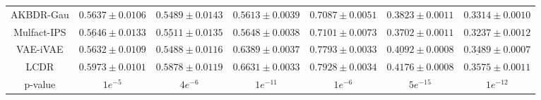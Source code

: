 \documentclass[sigconf]{acmart}
\begin{document}
\begin{table}[!t]
{\begin{tabular}{c|cc|cc|cc}
AKBDR-Gau & $0.5637 \pm 0.0106$ & $0.5489 \pm 0.0143$ & $0.5613 \pm 0.0039$ & $0.7087 \pm 0.0051$ & $0.3823 \pm 0.0011$ & $0.3314 \pm 0.0010$ \\
Mulfact-IPS  & $\underline{0.5646} \pm 0.0133$ & $\underline{0.5511} \pm 0.0135$ & $0.5648 \pm 0.0038$ & $0.7101 \pm 0.0073$ & $0.3702 \pm 0.0011$ & $0.3237 \pm 0.0012$ \\
VAE-iVAE  & $0.5632 \pm 0.0109$ & $0.5488 \pm 0.0116$ & $0.6389 \pm 0.0037$ & $0.7793 \pm 0.0033$ & $\underline{0.4092} \pm 0.0008$ & $\underline{0.3489} \pm 0.0007$ \\
LCDR  & $\mathbf{0.5973} \pm 0.0101$ & $\mathbf{0.5878} \pm 0.0119$ & $\mathbf{0.6631} \pm 0.0033$ & $\mathbf{0.7928} \pm 0.0034$ & $\mathbf{0.4176} \pm 0.0008$ & $\mathbf{0.3575} \pm 0.0011$ \\ 
\hline
p-value & $1 e^{-5}$ & $4 e^{-6}$ & $1 e^{-11}$ & $1 e^{-6}$ & $5 e^{-15}$ & $1 e^{-12}$ \\
\hline
 
\end{tabular}
}
\vspace{10pt}
\end{table}

\end{document}
